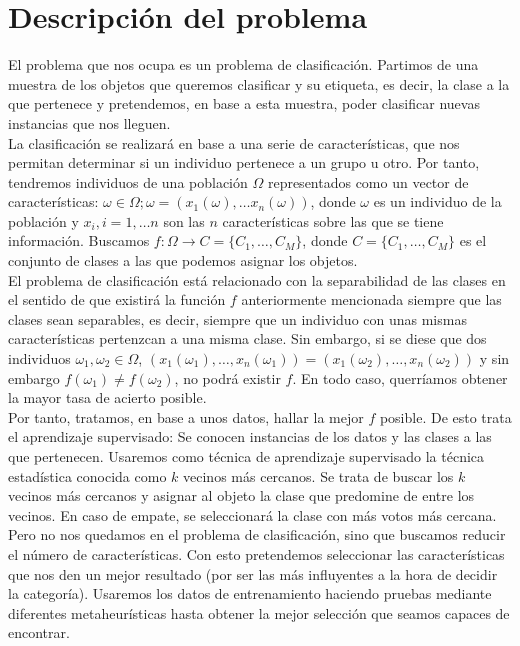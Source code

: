 \documentclass[11pt,leqno]{article}
\begin{document}
\section{Descripción del problema}

El problema que nos ocupa es un problema de clasificación. Partimos de una muestra de los objetos que queremos clasificar y su etiqueta, es decir, la clase a la que pertenece y pretendemos, en base a esta muestra, poder clasificar nuevas instancias que nos lleguen.\\
La clasificación se realizará en base a una serie de características, que nos permitan determinar si un individuo pertenece a un grupo u otro. Por tanto, tendremos individuos de una población $\Omega$ representados como un vector de características: $ \omega \in \Omega; \omega = (x_1(\omega), \dots x_n(\omega))$, donde $\omega$ es un individuo de la población y $x_i, i=1,\dots n$ son las $n$ características sobre las que se tiene información. Buscamos $f:\Omega \longrightarrow C=\{C_1, \dots, C_M\}$, donde $C=\{C_1, \dots, C_M\}$ es el conjunto de clases a las que podemos asignar los objetos.\\
El problema de clasificación está relacionado con la separabilidad de las clases en el sentido de que existirá la función $f$  anteriormente mencionada siempre que las clases sean separables, es decir, siempre que un individuo con unas mismas características pertenzcan a una misma clase. Sin embargo, si se diese que dos individuos $\omega_1, \omega_2 \in \Omega$, $(x_1(\omega_1), \dots, x_n(\omega_1))=(x_1(\omega_2), \dots, x_n(\omega_2))$ y sin embargo $f(\omega_1) \neq f(\omega_2)$, no podrá existir $f$. En todo caso, querríamos obtener la mayor tasa de acierto posible.\\  
Por tanto, tratamos, en base a unos datos, hallar la mejor $f$ posible. De esto trata el aprendizaje supervisado: Se conocen instancias de los datos y las clases a las que pertenecen. Usaremos como técnica de aprendizaje supervisado la técnica estadística conocida como $k$ vecinos más cercanos. Se trata de buscar los $k$ vecinos más cercanos y asignar al objeto la clase que predomine de entre los vecinos. En caso de empate, se seleccionará la clase con más votos más cercana.\\  
Pero no nos quedamos en el problema de clasificación, sino que buscamos reducir el número de características. Con esto pretendemos seleccionar las características que nos den un mejor resultado (por ser las más influyentes a la hora de decidir la categoría). Usaremos los datos de entrenamiento haciendo pruebas mediante diferentes metaheurísticas hasta obtener la mejor selección que seamos capaces de encontrar.\\  
\end{document}
